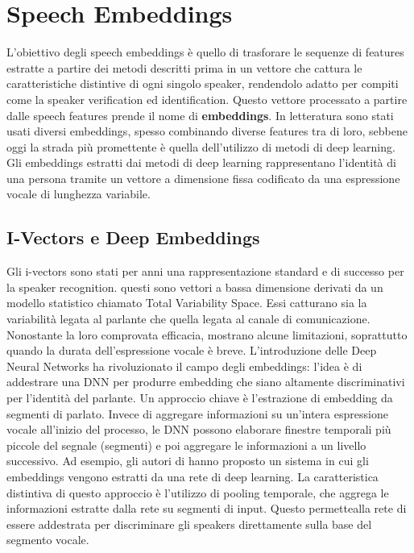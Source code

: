 \section{Speech Embeddings}
L'obiettivo degli speech embeddings è quello di trasforare le sequenze di features estratte a partire dei metodi descritti prima
in un vettore che cattura le caratteristiche distintive di ogni singolo speaker, rendendolo adatto per compiti come la speaker verification ed identification. 
Questo vettore processato a partire dalle speech features prende il nome di \textbf{embeddings}. In letteratura sono stati usati diversi
embeddings, spesso combinando diverse features tra di loro, sebbene oggi la strada più promettente è quella dell'utilizzo di metodi di deep learning. 
Gli embeddings estratti dai metodi di deep learning rappresentano l'identità di una persona tramite un vettore a dimensione fissa codificato da una espressione
vocale di lunghezza variabile. 

\subsection{I-Vectors e Deep Embeddings}
Gli i-vectors sono stati per anni una rappresentazione standard e di successo per la speaker recognition.
questi sono vettori a bassa dimensione derivati da un modello statistico chiamato Total Variability Space. Essi catturano 
sia la variabilità legata al parlante che quella legata al canale di comunicazione. Nonostante la loro comprovata efficacia, 
mostrano alcune limitazioni, soprattutto quando la durata dell'espressione vocale è breve. 
L'introduzione delle Deep Neural Networks ha rivoluzionato il campo degli embeddings: l'idea è di addestrare una DNN per produrre 
embedding che siano altamente discriminativi per l'identità del parlante. 
Un approccio chiave è l'estrazione di embedding da segmenti di parlato. Invece di aggregare informazioni su un'intera espressione 
vocale all'inizio del processo, le DNN possono elaborare finestre temporali più piccole del segnale (segmenti) e poi aggregare le 
informazioni a un livello successivo. Ad esempio, gli autori di \cite{snyder2017deep} hanno proposto un sistema in cui gli embeddings 
vengono estratti da una rete di deep learning. La caratteristica distintiva di questo approccio è l'utilizzo di pooling temporale, che aggrega le informazioni 
estratte dalla rete su segmenti di input. Questo permettealla rete di essere addestrata per discriminare gli speakers direttamente sulla base 
del segmento vocale. 

